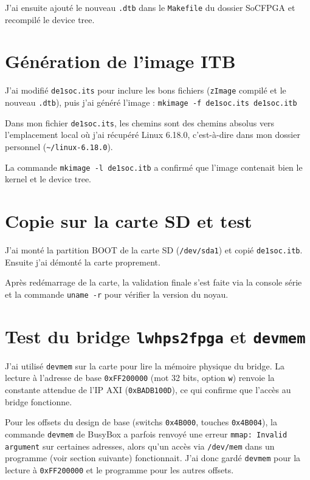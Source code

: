 \documentclass[a4paper,12pt]{article}
\begin{document}
J'ai ensuite ajouté le nouveau \texttt{.dtb} dans le \texttt{Makefile} du dossier SoCFPGA et recompilé le device tree.

\section{Génération de l'image ITB}

J'ai modifié \texttt{de1soc.its} pour inclure les bons fichiers (\texttt{zImage} compilé et le nouveau \texttt{.dtb}), puis j'ai généré l'image :
\texttt{mkimage -f de1soc.its de1soc.itb}

Dans mon fichier \texttt{de1soc.its}, les chemins sont des chemins absolus vers l'emplacement local où j'ai récupéré Linux 6.18.0, c'est-à-dire dans mon dossier personnel (\texttt{\~{}/linux-6.18.0}).

La commande \texttt{mkimage -l de1soc.itb} a confirmé que l'image contenait bien le kernel et le device tree.

\section{Copie sur la carte SD et test}

J'ai monté la partition BOOT de la carte SD (\texttt{/dev/sda1}) et copié \texttt{de1soc.itb}. Ensuite j'ai démonté la carte proprement.

Après redémarrage de la carte, la validation finale s'est faite via la console série et la commande \texttt{uname -r} pour vérifier la version du noyau.

\newpage

\section{Test du bridge \texttt{lwhps2fpga} et \texttt{devmem}}

J'ai utilisé \texttt{devmem} sur la carte pour lire la mémoire physique du bridge. La lecture à l'adresse de base \texttt{0xFF200000} (mot 32 bits, option \texttt{w}) renvoie la constante attendue de l'IP AXI (\texttt{0xBADB100D}), ce qui confirme que l'accès au bridge fonctionne.

Pour les offsets du design de base (switchs \texttt{0x4B000}, touches \texttt{0x4B004}), la commande \texttt{devmem} de BusyBox a parfois renvoyé une erreur \texttt{mmap: Invalid argument} sur certaines adresses, alors qu'un accès via \texttt{/dev/mem} dans un programme (voir section suivante) fonctionnait. J'ai donc gardé \texttt{devmem} pour la lecture à \texttt{0xFF200000} et le programme pour les autres offsets.
\end{document}
